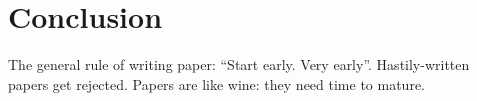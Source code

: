 
\section{Conclusion}
\label{sec:conclusion}
The general rule of writing paper: ``Start early. Very early''. Hastily-written papers get rejected. Papers are like wine: they need time to mature.

